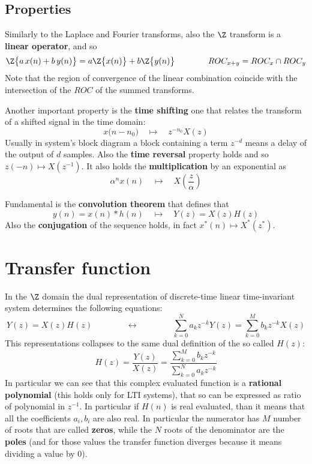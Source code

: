 	
\subsection{Properties}
	Similarly to the Laplace and Fourier transforms, also the $\Z$ transform is a \textbf{linear operator}, and so
	\[ \Z\big\{ a \, x(n) + b\, y(n) \big\} = a \Z\big\{ x(n) \big\} + b \Z\big\{ y(n) \big\}  \qquad \qquad ROC_{x+y} = ROC_x \cap ROC_y \]
	Note that the region of convergence of the linear combination coincide with the intersection of the $ROC$ of the summed transforms.
	
	Another important property is the \textbf{time shifting} one that relates the transform of a shifted signal in the time domain:
	\[ x\big(n-n_0\big)  \quad \mapsto \quad z^{-n_0} X(z) \]
	Usually in system's block diagram a block containing a term $z^{-d}$ means a delay of the output of $d$ samples. Also the \textbf{time reversal} property holds and so $z(-n) \mapsto X(z^{-1})$. It also holds the \textbf{multiplication} by an exponential as
	\[ \alpha^n x(n) \quad \mapsto \quad X\left(\frac z \alpha \right) \]
	
	Fundamental is the \textbf{convolution theorem} that defines that
	\[ y(n) = x(n) * h(n) \quad \mapsto \quad Y(z) = X(z)H(z) \]
	Also the \textbf{conjugation} of the sequence holds, in fact $x^*(n) \mapsto X^*(z^*)$.
	
	
\section{Transfer function}
	In the $\Z$ domain the dual representation of discrete-time linear time-invariant system determines the following equations:
	\[ Y(z) = X(z) H(z) \qquad \qquad \leftrightarrow \qquad \qquad \sum_{k=0}^N a_k z^{-k} Y(z) = \sum_{k=0}^M b_kz^{-k} X(z) \]
	This representations collapses to the same dual definition of the so called  $H(z)$:
	\begin{equation}
		H(z) = \frac{Y(z)}{X(z)} = \frac{ \sum_{k=0}^M b_k z^{-k}}{\sum_{k=0}^N a_k z^{-k}}
	\end{equation}
	In particular we can see that this complex evaluated function is a \textbf{rational polynomial} (this holds only for LTI systems), that so can be expressed as ratio of polynomial in $z^{-1}$. In particular if $H(n)$ is real evaluated, than it means that all the coefficients $a_i,b_i$ are also real. In particular the numerator has $M$ number of roots that are called \textbf{zeros}, while the $N$ roots of the denominator are the \textbf{poles} (and for those values the transfer function diverges because it means dividing a value by 0). \vspace{3mm}
	
